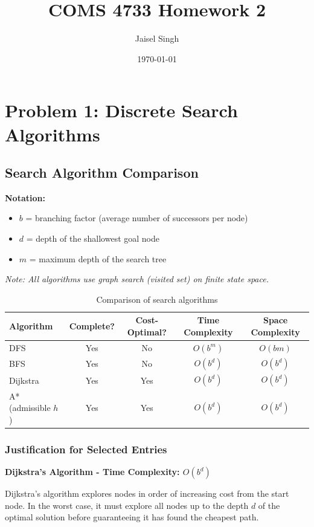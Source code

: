 \documentclass[11pt]{article}
\title{COMS 4733 Homework 2}
\author{Jaisel Singh}
\date{\today}
\begin{document}
\maketitle
\section{Problem 1: Discrete Search Algorithms}
\subsection{Search Algorithm Comparison}
\noindent\textbf{Notation:}
\begin{itemize}
\item $b$ = branching factor (average number of successors per node)
\item $d$ = depth of the shallowest goal node
\item $m$ = maximum depth of the search tree
\end{itemize}
\noindent\textit{Note: All algorithms use graph search (visited set) on finite state space.}

\begin{table}[h]
\centering
\begin{tabular}{|l|c|c|c|c|}
\hline
\textbf{Algorithm} & \textbf{Complete?} & \textbf{Cost-Optimal?} & \textbf{Time Complexity} & \textbf{Space Complexity} \\
\hline
DFS & Yes & No & $O(b^m)$ & $O(bm)$ \\
\hline
BFS & Yes & No & $O(b^d)$ & $O(b^d)$ \\
\hline
Dijkstra & Yes & Yes & $O(b^d)$ & $O(b^d)$ \\
\hline
A* (admissible $h$) & Yes & Yes & $O(b^d)$ & $O(b^d)$ \\
\hline
\end{tabular}
\caption{Comparison of search algorithms}
\label{tab:search_comparison}
\end{table}

\subsubsection*{Justification for Selected Entries}

\textbf{Dijkstra's Algorithm - Time Complexity: $O(b^d)$}

Dijkstra's algorithm explores nodes in order of increasing cost from the start node. In the worst case, it must explore all nodes up to the depth $d$ of the optimal solution before guaranteeing it has found the cheapest path.
\end{document}
